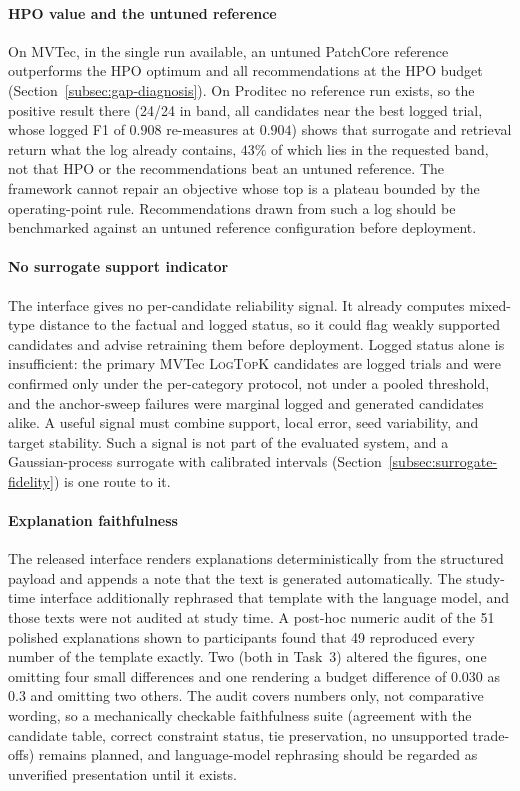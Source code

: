 \documentclass[final,5p,times,twocolumn]{elsarticle}
\begin{document}
\paragraph{HPO value and the untuned reference}
On MVTec, in the single run available, an untuned PatchCore reference outperforms the HPO optimum and all recommendations at the HPO budget (Section~\ref{subsec:gap-diagnosis}).
On Proditec no reference run exists, so the positive result there
(24/24 in band, all candidates near the best logged trial, whose logged
F1 of $0.908$ re-measures at $0.904$) shows that surrogate and retrieval
return what the log already contains, $43\%$ of which lies in the
requested band, not that HPO or the recommendations beat an untuned reference. The
framework cannot repair an objective whose top is a plateau bounded by the operating-point rule. Recommendations drawn from such a log should
be benchmarked against an untuned reference configuration before deployment.

\paragraph{No surrogate support indicator}
The interface gives no per-candidate reliability signal. It already
computes mixed-type distance to the factual and logged status, so it could flag weakly supported candidates and advise retraining them before deployment.
Logged status alone is insufficient: the primary MVTec \textsc{LogTopK}
candidates are logged trials and were confirmed only under the per-category protocol, not under a pooled threshold, and the anchor-sweep failures were marginal logged and
generated candidates alike. A useful signal must combine support, local
error, seed variability, and target stability. Such a signal is not part of the evaluated system, and a Gaussian-process surrogate with
calibrated intervals (Section~\ref{subsec:surrogate-fidelity}) is one
route to it.

\paragraph{Explanation faithfulness}
The released interface renders explanations deterministically from the
structured payload and appends a note that the text is generated
automatically. The study-time interface additionally rephrased that
template with the language model, and those texts were not audited at
study time. A post-hoc numeric audit of the 51 polished explanations
shown to participants found that 49 reproduced every number of the template exactly. Two (both in Task~3) altered the figures, one omitting
four small differences and one rendering a budget difference of $0.030$
as $0.3$ and omitting two others. The audit covers numbers only, not
comparative wording, so a mechanically checkable faithfulness suite
(agreement with the candidate table, correct constraint status, tie
preservation, no unsupported trade-offs) remains planned, and
language-model rephrasing should be regarded as unverified presentation
until it exists.
\end{document}

